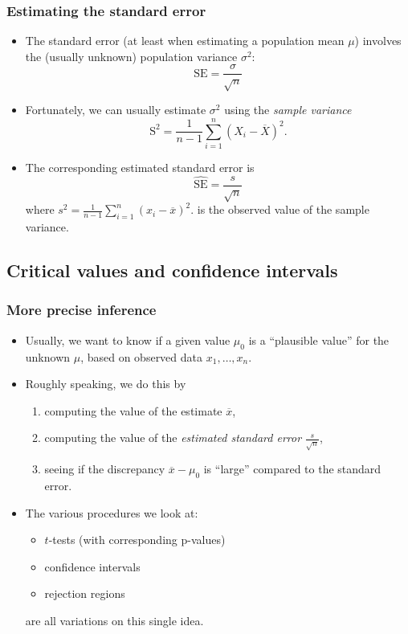 \documentclass[a4paper]{article}\usepackage[]{graphicx}\usepackage[]{xcolor}
\begin{document}
\subsubsection{Estimating the standard error}
\begin{itemize}
	\item The standard error (at least when estimating a population mean \( \mu \)) involves the (usually unknown) population variance \( \sigma^2 \):
	\[
		\mathrm{SE} = \frac{\sigma}{\sqrt{n}}
	\]
	\item Fortunately, we can usually estimate \( \sigma^{2} \) using the \textit{sample variance}
	\[
		\mathrm{S}^{2} = \frac{1}{n-1} \sum_{i=1}^{n} (X_i - \overline{X})^2.
	\]
	\item The corresponding estimated standard error is
	\[
		\widehat{\mathrm{SE}} = \frac{s}{\sqrt{n}}
	\]
	where \( s^{2} = \frac{1}{n-1} \sum_{i=1}^{n} (x_i - \overline{x})^2. \)  is the observed value of the sample variance.
\end{itemize}
\subsection{Critical values and confidence intervals}
\subsubsection{More precise inference}
\begin{itemize}
	\item Usually, we want to know if a given value \( \mu_0 \) is a ``plausible value'' for the unknown \( \mu \), based on observed data \( x_1,\dotsc,x_n \).
	\item Roughly speaking, we do this by
	\begin{enumerate}
		\item computing the value of the estimate \( \overline{x} \),
		\item computing the value of the \textit{estimated standard error} \( \frac{s}{\sqrt{n}} \),
		\item seeing if the discrepancy \( \overline{x} - \mu_0 \) is ``large'' compared to the standard error.
	\end{enumerate}
	\item The various procedures we look at:
	\begin{itemize}
		\item \( t \)-tests (with corresponding p-values)
		\item confidence intervals
		\item rejection regions
	\end{itemize}
	are all variations on this single idea.
\end{itemize}
\end{document}
